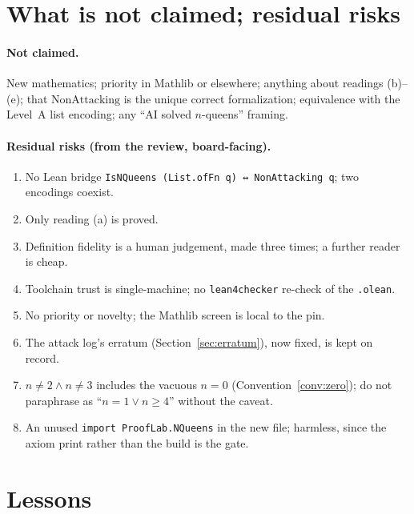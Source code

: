 \documentclass[11pt,a4paper]{article}
\theoremstyle{definition}
\theoremstyle{remark}
\newcommand{\lean}[1]{\texttt{#1}}
\newcommand{\NonAttacking}{\mathrm{NonAttacking}}
\begin{document}
\section{What is not claimed; residual risks}
\label{sec:residuals}

\paragraph{Not claimed.}
New mathematics; priority in Mathlib or elsewhere; anything about readings (b)--(e);
that $\NonAttacking$ is the unique correct formalization; equivalence with the Level~A
list encoding; any ``AI solved $n$-queens'' framing.

\paragraph{Residual risks (from the review, board-facing).}
\begin{enumerate}[nosep]
\item No Lean bridge \lean{IsNQueens (List.ofFn q) ↔ NonAttacking q}; two encodings coexist.
\item Only reading (a) is proved.
\item Definition fidelity is a human judgement, made three times; a further reader is cheap.
\item Toolchain trust is single-machine; no \lean{lean4checker} re-check of the \texttt{.olean}.
\item No priority or novelty; the Mathlib screen is local to the pin.
\item The attack log's erratum (Section~\ref{sec:erratum}), now fixed, is kept on record.
\item $n\neq 2\wedge n\neq 3$ includes the vacuous $n=0$ (Convention~\ref{conv:zero}); do not
paraphrase as ``$n=1\vee n\ge 4$'' without the caveat.
\item An unused \lean{import ProofLab.NQueens} in the new file; harmless, since the axiom
print rather than the build is the gate.
\end{enumerate}

\section{Lessons}
\label{sec:lessons}
\end{document}
